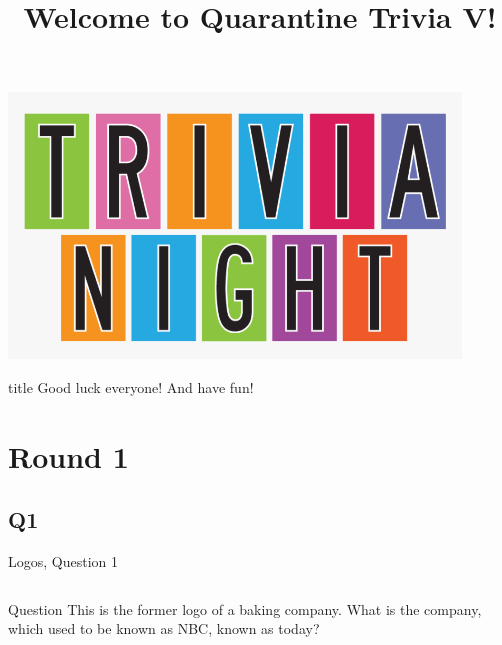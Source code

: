 \documentclass[11pt]{beamer}
\begin{document}
\title{Welcome to Quarantine Trivia V!\vspace{-0.5in}}
\date{}

\begin{frame}
\titlepage{}
\begin{center}
\includegraphics[max width=0.9\textwidth,
    max height=0.4\textheight]{Images/triviatitleframelogo.png}
\end{center}
\end{frame}

\begingroup{}
\begin{frame}
\vfill{}
\begin{beamercolorbox}[sep=8pt,center,shadow=true,rounded=true]{title}
Good luck everyone! And have fun!
\end{beamercolorbox}
\vfill{}
\end{frame}
\endgroup{}
\def\thisSectionName{Logos}
\section{Round 1}
\subsection*{Q1}
\begin{frame}[t]{Logos, Question 1}
\begin{columns}[T,totalwidth=\linewidth]
\begin{column}{0.32\linewidth}
\begin{block}{Question}
This is the former logo of a baking company. What is the company, which used to be known as NBC, known as today?
\end{block}
\end{column}
\begin{column}{0.65\linewidth}
\begin{center}
\texttt{[image: \{Images/nabisco]}.jpg}
\end{center}
\end{column}
\end{columns}
\end{frame}
\end{document}
